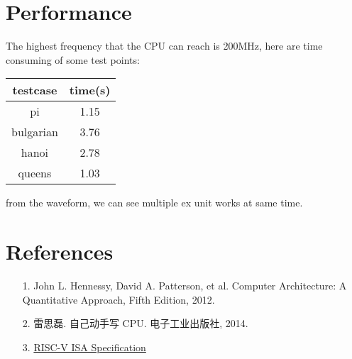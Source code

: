 \documentclass[UTF8]{ctexart}
\begin{document}
\section{Performance}
    The highest frequency that the CPU can reach is 200MHz, here are time consuming of some test points:
    \begin{center}
        \begin{tabular}{cc}
            \hline
            testcase & time(s)\\
            \hline
            pi & 1.15 \\
            \hline
            bulgarian & 3.76 \\
            \hline
            hanoi & 2.78 \\
            \hline
            queens & 1.03 \\
            \hline
        \end{tabular}
    \end{center}
    from the waveform, we can see multiple ex unit works at same time.
    
\section{References}
    \begin{itemize}
        \item [1.] 
        John L. Hennessy, David A. Patterson, et al. Computer Architecture: A Quantitative Approach, Fifth Edition, 2012.
        \item [2.]
        雷思磊. 自己动手写 CPU. 电子工业出版社, 2014.
        \item [3.]
        \href{http://riscv.org/specifications/}{RISC-V ISA Specification}
    \end{itemize}
\end{document}
